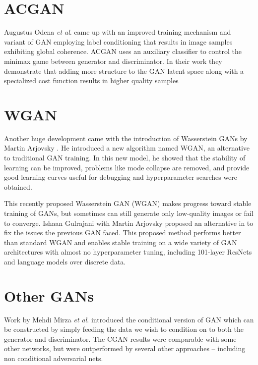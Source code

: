 
\section{ACGAN} %
\label{sec:acgan}
Augustus Odena \textit{et al}. \cite{acgan} came up with an improved training mechanism and variant of GAN employing label conditioning that results in image samples exhibiting global coherence. ACGAN uses an auxiliary classifier to control the minimax game between generator and discriminator. In their work they demonstrate that adding more structure to the GAN latent space along with a specialized cost function results in higher quality samples

\section{WGAN} %
\label{sec:wgan}
Another huge development came with the introduction of Wasserstein GANs by Martin Arjovsky \cite{wgan} . He introduced a new algorithm named WGAN, an alternative to traditional GAN training. In this new model, he showed that the stability of learning can be improved, problems like mode collapse are removed, and provide good learning curves useful for debugging and hyperparameter searches were obtained.
\par\bigskip

This recently proposed Wasserstein GAN (WGAN) \cite{wgan} makes progress toward stable training of GANs, but sometimes can still generate only low-quality images or fail to converge. Ishaan Gulrajani with Martin Arjovsky proposed an alternative in \cite{improvedwgan} to fix the issues the previous GAN faced. This proposed method performs better than standard WGAN and enables stable training on a wide variety of GAN architectures with almost no hyperparameter tuning, including 101-layer ResNets \cite{deepresidual} and language models over discrete data.
\par\bigskip

\section{Other GANs} %
\label{sec:other_gan}
Work by Mehdi Mirza \textit{et al}. \cite{congan} introduced the conditional version of GAN which can be constructed by simply feeding the data we wish to condition on to both the generator and discriminator. The CGAN results were comparable with some other networks, but were outperformed by several other approaches – including non conditional adversarial nets.
\par\bigskip

